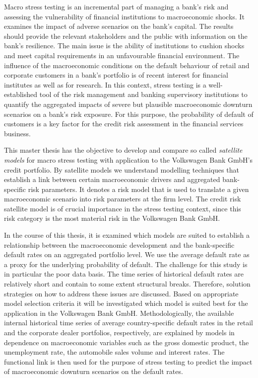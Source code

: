 \documentclass[a4paper, 11pt]{scrreprt}
\begin{document}
Macro stress testing is an incremental part of managing a bank's risk and assessing the vulnerability of financial institutions to macroeconomic shocks. 
It examines the impact of adverse scenarios on the bank's capital. 
The results should provide the relevant stakeholders and the public with information on the bank's resilience. The main issue is the ability of institutions to cushion shocks and meet capital requirements in an unfavourable financial environment.
The influence of the macroeconomic conditions on the default behaviour of retail and corporate customers in a bank's portfolio is of recent interest for financial institutes as well as for research. In this context, stress testing is a well-established tool of the risk management and banking supervisory institutions to quantify the aggregated impacts of severe but plausible macroeconomic downturn scenarios on a bank's risk exposure.
For this purpose, the probability of default of customers is a key factor for the credit risk assessment in the financial services business.

This master thesis has the objective to develop and compare so called \textit{satellite models} \linebreak for macro stress testing with application to the Volkswagen Bank GmbH's credit portfolio. By satellite models we understand modelling techniques that establish a link between certain macroeconomic drivers and aggregated bank-specific risk parameters. It denotes a risk model that is used to translate a given macroeconomic scenario into risk parameters at the firm level.
The credit risk satellite model is of crucial importance in the stress testing context, since this risk category is the most material risk in the Volkswagen Bank GmbH.

\bigskip

In the course of this thesis, it is examined which models are suited to establish a relationship between the macroeconomic development and the bank-specific default rates on an aggregated portfolio level. We use the average default rate as a proxy for the underlying probability of default.
The challenge for this study is in particular the poor data basis. The time series of historical default rates are relatively short and contain to some extent structural breaks. Therefore, solution strategies on how to address these issues are discussed. Based on appropriate model selection criteria it will be investigated which model is suited best for the application in the Volkswagen Bank GmbH.
Methodologically, the available internal historical time series of average country-specific default rates in the retail and the corporate dealer portfolios, respectively, are explained by models in dependence on macroeconomic variables such as the gross domestic product, the unemployment rate, the automobile sales volume and interest rates.
The functional link is then used for the purpose of stress testing to predict the impact of macroeconomic downturn scenarios on the default rates. 
\end{document}
